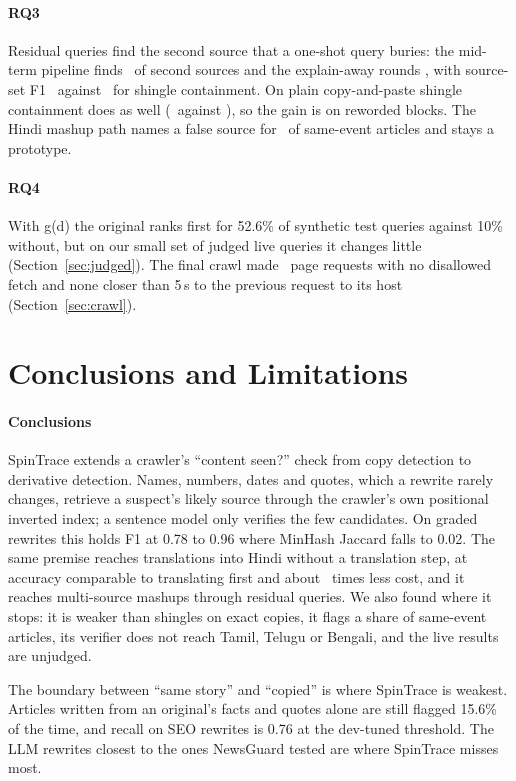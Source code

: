 \documentclass[11pt,a4paper]{article}
\begin{document}
\paragraph{RQ3} Residual queries find the second source that a one-shot query buries: the mid-term pipeline finds \nMsSecondMid\ of second sources and the explain-away rounds \nMsSecondSpin, with source-set F1 \nMsAll\ against \nMsContAll\ for shingle containment. On plain copy-and-paste shingle containment does as well (\nMsPlainCont\ against \nMsPlain), so the gain is on reworded blocks. The Hindi mashup path names a false source for \nXlmFalseSame\ of same-event articles and stays a prototype.

\paragraph{RQ4} With g(d) the original ranks first for 52.6\% of synthetic test queries against 10\% without, but on our small set of judged live queries it changes little (Section~\ref{sec:judged}). The final crawl made \nCrawlReq\ page requests with no disallowed fetch and none closer than 5\,s to the previous request to its host (Section~\ref{sec:crawl}).

\section{Conclusions and Limitations}
\label{sec:limits}

\paragraph{Conclusions} SpinTrace extends a crawler's ``content seen?'' check from copy detection to derivative detection. Names, numbers, dates and quotes, which a rewrite rarely changes, retrieve a suspect's likely source through the crawler's own positional inverted index; a sentence model only verifies the few candidates. On graded rewrites this holds F1 at 0.78 to 0.96 where MinHash Jaccard falls to 0.02. The same premise reaches translations into Hindi without a translation step, at accuracy comparable to translating first and about \nSpeedup\ times less cost, and it reaches multi-source mashups through residual queries. We also found where it stops: it is weaker than shingles on exact copies, it flags a share of same-event articles, its verifier does not reach Tamil, Telugu or Bengali, and the live results are unjudged.

The boundary between ``same story'' and ``copied'' is where SpinTrace is weakest. Articles written from an original's facts and quotes alone are still flagged 15.6\% of the time, and recall on SEO rewrites is 0.76 at the dev-tuned threshold. The LLM rewrites closest to the ones NewsGuard tested are where SpinTrace misses most.
\end{document}
